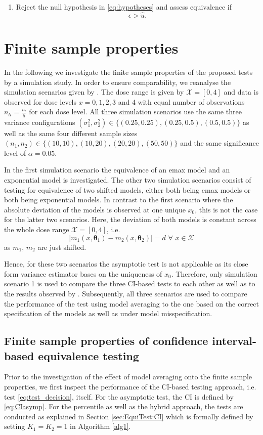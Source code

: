 {\begin{breakablealgorithm}
\begin{enumerate}
        \item 
            Reject the null hypothesis in \eqref{eq:hypotheses} and assess equivalence if $$\epsilon > \hat{u}.$$
	\end{enumerate}		

\end{breakablealgorithm}
\section{Finite sample properties} \label{sec:simu}
In the following we investigate the finite sample properties of the proposed tests by a simulation study. In order to ensure comparability, we reanalyse the simulation scenarios given by \cite{Dette2018}.
The dose range is given by $\mathcal{X}=[0,4]$ and data is observed for dose levels $x=0, 1,2,3$ and 4 with equal number of observations $n_{li} = \frac{n_l}{5}$ for each dose level.
All three simulation scenarios use the same three variance configurations $(\sigma_1^2, \sigma_2^2) \in \{(0.25, 0.25), (0.25, 0.5), (0.5, 0.5)\}$ as well as the same four different sample sizes $(n_1, n_2) \in \{(10, 10), (10, 20), (20, 20), (50, 50) \}$ and the same significance level of $\alpha = 0.05$.

In the first simulation scenario the equivalence of an emax model and an exponential model is investigated. The other two simulation scenarios consist of testing for equivalence of two shifted models, either both being emax models or both being exponential models. 
In contrast to the first scenario where the absolute deviation of the models is observed at one unique $x_0$, this is not the case for the latter two scenarios. 
Here, the deviation of both models is constant across the whole dose range $\mathcal{X}=[0,4]$, i.e. 
$$
|m_1(x, \boldsymbol{\theta}_{1}) - m_2(x, \boldsymbol{\theta}_{2})| = d \, \, \forall \, \, x \in \mathcal{X}
$$
as $m_1$, $m_2$ are just shifted. 

Hence, for these two scenarios the asymptotic test is not applicable as its close form variance estimator bases on the uniqueness of $x_0$. Therefore, only simulation scenario 1 is used to compare the three CI-based tests to each other as well as to the results observed by \citet{Dette2018}. 
Subsequently, all three scenarios are used to compare the performance of the test using model averaging to the one based on the correct specification of the models as well as under model misspecification. 

\subsection{Finite sample properties of confidence interval-based equivalence testing} \label{sec:simu:CI}
Prior to the investigation of the effect of model averaging onto the finite sample properties, we first inspect the performance of the CI-based testing approach, i.e. test \eqref{eq:test_decision}, itself. 
For the asymptotic test, the CI is defined by \eqref{eq:CIasymp}. 
For the percentile as well as the hybrid approach, the tests are conducted as explained in Section \ref{sec:EquiTest:CI} which is formally defined by setting $K_1 = K_2 = 1$ in Algorithm \ref{alg1}. 

}

